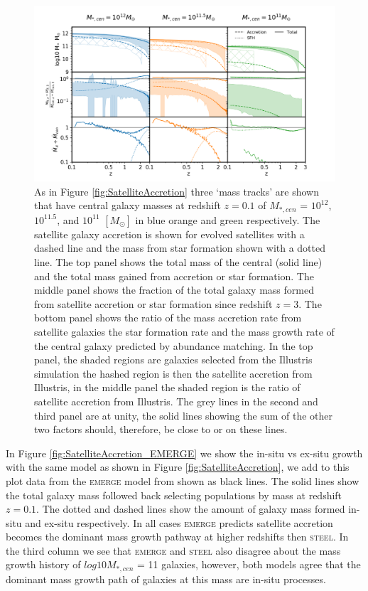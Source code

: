 \begin{figure}
    \centering
    \includegraphics[width = \linewidth]{Appendices/StellarMassAssembly/SatelliteAccretion_G19_ill.png}
    \caption{As in Figure \ref{fig:SatelliteAccretion} three `mass tracks' are shown that have central galaxy masses at redshift $z = 0.1$ of $M_{*,cen}$ = $10^{12}$, $10^{11.5}$, and $10^{11}$ $[M_{\odot}]$ in blue orange and green respectively. The satellite galaxy accretion is shown for evolved satellites with a dashed line and the mass from star formation shown with a dotted line. The top panel shows the total mass of the central (solid line) and the total mass gained from accretion or star formation. The middle panel shows the fraction of the total galaxy mass formed from satellite accretion or star formation since redshift $z=3$. The bottom panel shows the ratio of the mass accretion rate from satellite galaxies the star formation rate and the mass growth rate of the central galaxy predicted by abundance matching. In the top panel, the shaded regions are galaxies selected from the Illustris simulation the hashed region is then the satellite accretion from Illustris, in the middle panel the shaded region is the ratio of satellite accretion from Illustris. The grey lines in the second and third panel are at unity, the solid lines showing the sum of the other two factors should, therefore, be close to or on these lines.}
    \label{fig:SatelliteAccretion_ill}
\end{figure}

In Figure \ref{fig:SatelliteAccretion_EMERGE} we show the in-situ vs ex-situ growth with the same model as shown in Figure \ref{fig:SatelliteAccretion}, we add to this plot data from the \textsc{emerge} model from \citet{Moster2018Emerge10} shown as black lines. The solid lines show the total galaxy mass followed back selecting populations by mass at redshift $z = 0.1$. The dotted and dashed lines show the amount of galaxy mass formed in-situ and ex-situ respectively. In all cases \textsc{emerge} predicts satellite accretion becomes the dominant mass growth pathway at higher redshifts then \textsc{steel}. In the third column we see that \textsc{emerge} and \textsc{steel} also disagree about the mass growth history of $log 10 M_{*,cen}$ = 11 galaxies, however, both models agree that the dominant mass growth path of galaxies at this mass are in-situ processes.

